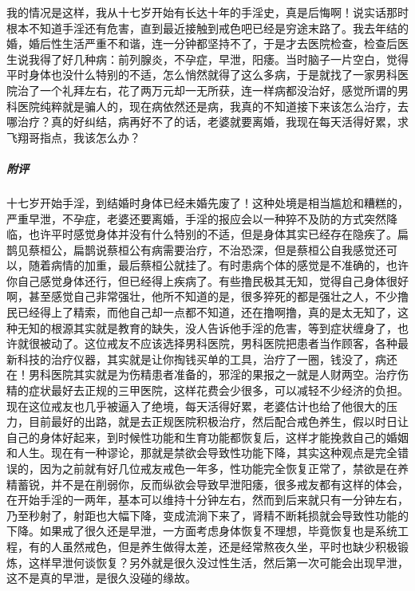 \begin{case}
    我的情况是这样，我从十七岁开始有长达十年的手淫史，真是后悔啊！说实话那时根本不知道手淫还有危害，直到最近接触到戒色吧已经是穷途末路了。我去年结的婚，婚后性生活严重不和谐，连一分钟都坚持不了，于是才去医院检查，检查后医生说我得了好几种病：前列腺炎，不孕症，早泄，阳痿。当时脑子一片空白，觉得平时身体也没什么特别的不适，怎么悄然就得了这么多病，于是就找了一家男科医院治了一个礼拜左右，花了两万元却一无所获，连一样病都没治好，感觉所谓的男科医院纯粹就是骗人的，现在病依然还是病，我真的不知道接下来该怎么治疗，去哪治疗？真的好纠结，病再好不了的话，老婆就要离婚，我现在每天活得好累，求飞翔哥指点，我该怎么办？
    \subparagraph{附评} 十七岁开始手淫，到结婚时身体已经未婚先废了！这种处境是相当尴尬和糟糕的，严重早泄，不孕症，老婆还要离婚，手淫的报应会以一种猝不及防的方式突然降临，也许平时感觉身体并没有什么特别的不适，但是身体其实已经存在隐疾了。扁鹊见蔡桓公，扁鹊说蔡桓公有病需要治疗，不治恐深，但是蔡桓公自我感觉还可以，随着病情的加重，最后蔡桓公就挂了。有时患病个体的感觉是不准确的，也许你自己感觉身体还行，但已经得上疾病了。有些撸民极其无知，觉得自己身体很好啊，甚至感觉自己非常强壮，他所不知道的是，很多猝死的都是强壮之人，不少撸民已经得上了精索，而他自己却一点都不知道，还在撸啊撸，真的是太无知了，这种无知的根源其实就是教育的缺失，没人告诉他手淫的危害，等到症状缠身了，也许就很被动了。这位戒友不应该选择男科医院，男科医院把患者当作顾客，各种最新科技的治疗仪器，其实就是让你掏钱买单的工具，治疗了一圈，钱没了，病还在！男科医院其实就是为伤精患者准备的，邪淫的果报之一就是人财两空。治疗伤精的症状最好去正规的三甲医院，这样花费会少很多，可以减轻不少经济的负担。现在这位戒友也几乎被逼入了绝境，每天活得好累，老婆估计也给了他很大的压力，目前最好的出路，就是去正规医院积极治疗，然后配合戒色养生，假以时日让自己的身体好起来，到时候性功能和生育功能都恢复后，这样才能挽救自己的婚姻和人生。现在有一种谬论，那就是禁欲会导致性功能下降，其实这种观点是完全错误的，因为之前就有好几位戒友戒色一年多，性功能完全恢复正常了，禁欲是在养精蓄锐，并不是在削弱你，反而纵欲会导致早泄阳痿，很多戒友都有这样的体会，在开始手淫的一两年，基本可以维持十分钟左右，然而到后来就只有一分钟左右，乃至秒射了，射距也大幅下降，变成流淌下来了，肾精不断耗损就会导致性功能的下降。如果戒了很久还是早泄，一方面考虑身体恢复不理想，毕竟恢复也是系统工程，有的人虽然戒色，但是养生做得太差，还是经常熬夜久坐，平时也缺少积极锻炼，这样早泄何谈恢复？另外就是很久没过性生活，然后第一次可能会出现早泄，这不是真的早泄，是很久没碰的缘故。
\end{case}

